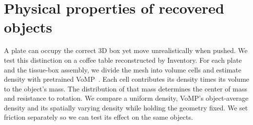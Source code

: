 \section{Physical properties of recovered objects}
\label{sec:physics-plan}
A plate can occupy the correct 3D box yet move unrealistically when pushed.
We test this distinction on a coffee table reconstructed by Inventory.
For each plate and the tissue-box assembly, we divide the mesh into volume
cells and estimate density with pretrained VoMP~\cite{vomp}. Each cell
contributes its density times its volume to the object's mass. The distribution
of that mass determines the center of mass and resistance to rotation.
We compare a uniform density, VoMP's object-average density and its spatially
varying density while holding the geometry fixed. We set friction separately
so we can test its effect on the same objects.
